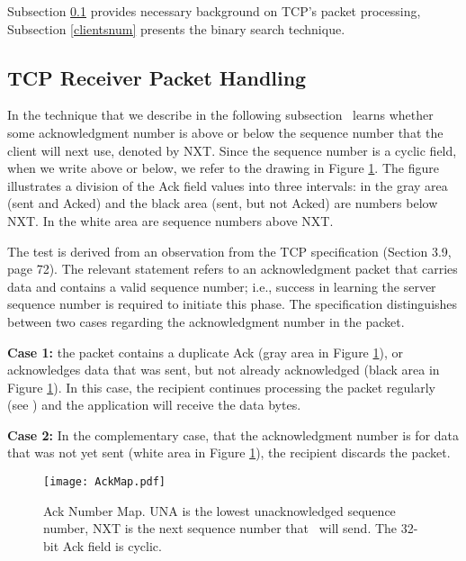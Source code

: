 \documentclass[conference]{IEEEtran}
\newcommand{\ignore}[1]{}
\begin{document}
Subsection \ref{tcprecv} provides necessary background on TCP's packet processing, Subsection \ref{clientsnum} presents the binary search technique.

\subsection{TCP Receiver Packet Handling} \label{tcprecv}

In the technique that we describe in the following subsection \mal\ learns whether some acknowledgment number is above or below the sequence number that the client will next use, denoted by NXT. Since the sequence number is a cyclic field, when we write above or below, we refer to the drawing in Figure \ref{fig:AckMap}. The figure illustrates a division of the Ack field values into three intervals: in the gray area (sent and Acked) and the black area (sent, but not Acked) are numbers below NXT. In the white area are sequence numbers above NXT. 

The test is derived from an observation from the TCP specification \cite{rfc793} (Section 3.9, page 72). The relevant statement refers to an acknowledgment packet that carries data and contains a valid sequence number; i.e., success in learning the server sequence number is required to initiate this phase. The specification distinguishes between two cases regarding the acknowledgment number in the packet. 

{\bf Case 1:} the packet contains a duplicate Ack (gray area in Figure \ref{fig:AckMap}), or acknowledges data that was sent, but not already acknowledged (black area in Figure \ref{fig:AckMap}). In this case, the recipient continues processing the packet regularly (see \cite{rfc793}) and the application will receive the data bytes.

{\bf Case 2:} In the complementary case, that the acknowledgment number is for data that was not yet sent (white area in Figure \ref{fig:AckMap}), the recipient discards the packet.

\begin{figure}
	\centering
		\texttt{[image: AckMap.pdf]}
	\caption{Ack Number Map. UNA is the lowest unacknowledged sequence number, NXT is the next sequence number that \wini\ will send. \ignore{Acknowledgments for data in the {\em gray} area are considered duplicates, acknowledgments for data in the {\em white} area are for unsent data, i.e., invalid. In the {\em black} area are sequence numbers for sent un-Acked data. }The 32-bit Ack field is cyclic.}
	\label{fig:AckMap}
\end{figure}
\end{document}
